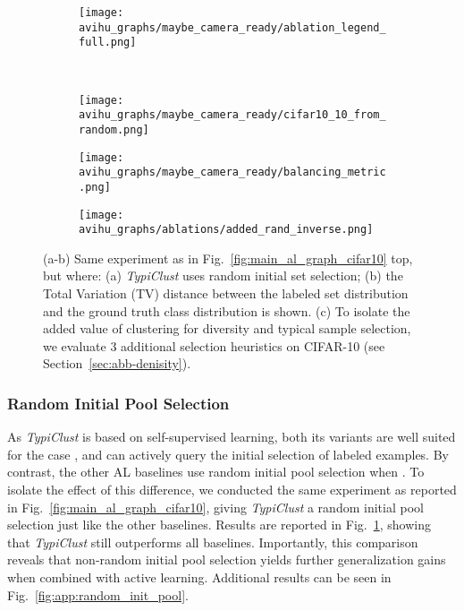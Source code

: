 \documentclass{article}
\begin{document}
\begin{figure}[htb]

\begin{subfigure}{.48\textwidth}
  \centering
 \texttt{[image: avihu\_graphs/maybe\_camera\_ready/ablation\_legend\_full.png]}
\end{subfigure}
\\
\begin{subfigure}{.157\textwidth}
  \centering
 \texttt{[image: avihu\_graphs/maybe\_camera\_ready/cifar10\_10\_from\_random.png]}
\caption{}

\label{fig:cifar10_random_init}
\end{subfigure}
\begin{subfigure}{.157\textwidth}
  \centering
 \texttt{[image: avihu\_graphs/maybe\_camera\_ready/balancing\_metric.png]}
\caption{}
\label{fig:balancing_metric}
\end{subfigure}
\begin{subfigure}{.157\textwidth}
  \centering
   \texttt{[image: avihu\_graphs/ablations/added\_rand\_inverse.png]}
\caption{}
\label{fig:scores_ablation}
\end{subfigure}

\vspace{-.2cm}
\caption{(a-b) Same experiment as in Fig.~\ref{fig:main_al_graph_cifar10} top, but where: (a) \emph{TypiClust} uses random initial set selection; (b) the Total Variation (TV) distance between the labeled set distribution and the ground truth class distribution is shown. 
(c) To isolate the added value of clustering for diversity and typical sample selection, we evaluate 3 additional selection heuristics on CIFAR-10 (see Section~\ref{sec:abb-denisity}).}
  \label{fig:agreement_testics}
\vspace{-0.25cm}
\end{figure}


\subsubsection{Random Initial Pool Selection}
\label{sec:starting_from_random}

As \textit{TypiClust} is based on self-supervised learning, both its variants are well suited for the case , and can actively query the initial selection of labeled examples. By contrast, the other AL baselines use random initial pool selection when . To isolate the effect of this difference, we conducted  the same experiment as reported in Fig.~\ref{fig:main_al_graph_cifar10}, giving \emph{TypiClust} a random initial pool selection just like the other baselines. Results are reported in  Fig.~\ref{fig:cifar10_random_init}, showing that \emph{TypiClust} still outperforms all baselines. Importantly, this comparison reveals that non-random initial pool selection yields further generalization gains when combined with active learning. Additional results can be seen in Fig.~\ref{fig:app:random_init_pool}.
\end{document}

